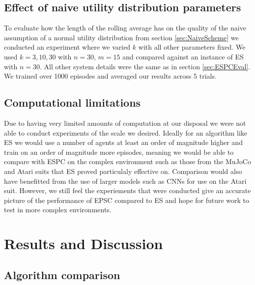 \subsection{Effect of naive utility distribution parameters}

To evaluate how the length of the rolling average has on the quality of the naive assumption of a normal utility distribution from section \ref{sec:NaiveScheme} we conducted an experiment where we varied $k$ with all other parameters fixed. We used $k=3,10,30$ with $n=30$, $m=15$ and compared against an instance of ES with $n=30$. All other system details were the same as in section \ref{sec:ESPCEval}. We trained over 1000 episodes and averaged our results across 5 trials.


    
\subsection{Computational limitations}
Due to having very limited amounts of computation at our disposal we were not able to conduct experiments of the scale we desired. Ideally for an algorithm like ES we would use a number of agents at least an order of magnitude higher and train on an order of magnitude more episodes, meaning we would be able to compare with ESPC on the complex environment such as those from the  MuJoCo \cite{MuJoCo} and Atari \cite{Atari} suits that ES proved particulaly effective on. Comparison would also have benefitted from the use of larger models such as CNNs for use on the Atari suit. However, we still feel the experiements that were conducted give an accurate picture of the performance of EPSC compared to ES and hope for future work to test in more complex environments.

\section{Results and Discussion}

\subsection{Algorithm comparison}

